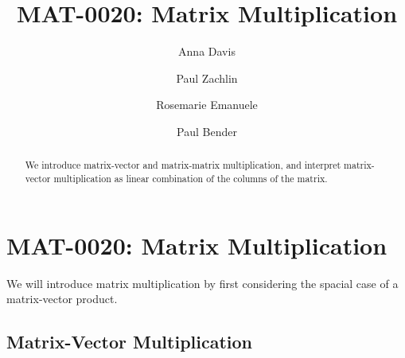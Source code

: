 \documentclass{ximera}
\author{Anna Davis \and Paul Zachlin \and Rosemarie Emanuele \and Paul Bender} \title{MAT-0020:  Matrix Multiplication} \license{CC-BY 4.0}
\begin{document}
\begin{abstract}
  We introduce matrix-vector and matrix-matrix multiplication, and interpret matrix-vector multiplication as linear combination of the columns of the matrix.
\end{abstract}
\maketitle

\section*{MAT-0020:  Matrix Multiplication}

We will introduce matrix multiplication by first considering the spacial case of a matrix-vector product.

\subsection*{Matrix-Vector Multiplication}
\end{document}
